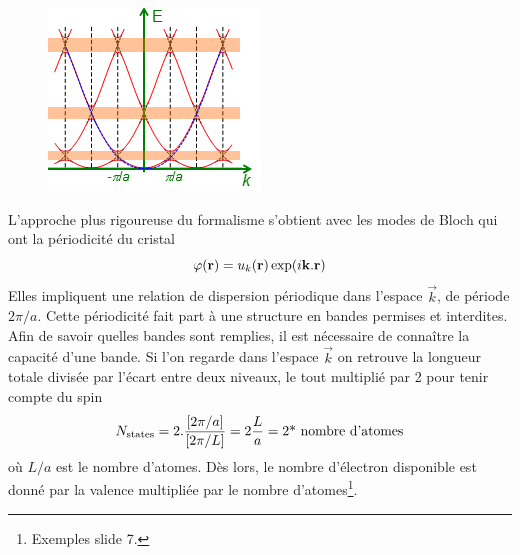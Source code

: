 	\begin{figure}
	\includegraphics[scale=0.6]{ch5/image6}
	\end{figure}
	L'approche plus rigoureuse du formalisme s'obtient avec les modes de Bloch qui ont la périodicité
	du cristal
	\begin{equation}
	\varphi ({\bf{r}}) = {u_k}({\bf{r}})\exp (i{\bf{k}}.{\bf{r}})
	\end{equation}
	Elles impliquent une relation de dispersion périodique dans l'espace $\vec k$, de période 
	$2\pi/a$. Cette périodicité fait part à une structure en bandes permises et interdites. Afin 
	de savoir quelles bandes sont remplies, il est nécessaire de connaître la capacité d'une bande.
	Si l'on regarde dans l'espace $\vec k$ on retrouve la longueur totale divisée par l'écart entre
	deux niveaux, le tout multiplié par 2 pour tenir compte du spin
	\begin{equation}
	{N_{{\rm{states}}}} = 2.\frac{{[2\pi /a]}}{{[2\pi /L]}} = 2\frac{L}{a}{\rm{ }} = \text{2*
	nombre d'atomes}
	\end{equation}
	où $L/a$ est le nombre d'atomes. Dès lors, le nombre d'électron disponible est donné par la 
	valence multipliée par le nombre d'atomes\footnote{Exemples slide 7.}.\\
	
